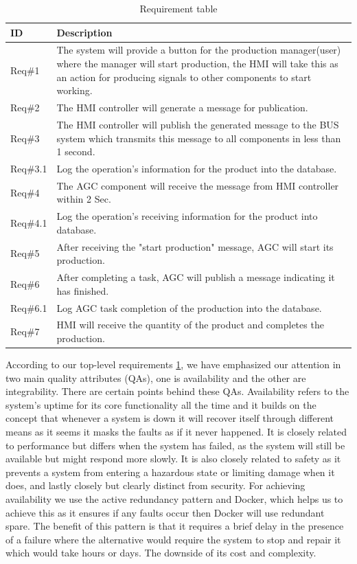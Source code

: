\begin{table}[h]
\begin{tabular}{|p{1cm}|p{7cm}|}
\hline
ID & Description \\
\hline
Req\#1 & The system will provide a button for the production manager(user) where the manager will start production, the HMI will take this as an action for producing signals to other components to start working. \\
\hline
Req\#2 & The HMI controller will generate a message for publication. \\
\hline
Req\#3 & The HMI controller will publish the generated message to the BUS system which transmits this message to all components in less than 1 second. \\
\hline
Req\#3.1 & Log the operation’s information for the product into the database. \\
\hline
Req\#4 & The AGC component will receive the message from HMI controller within 2 Sec. \\
\hline
Req\#4.1 & Log the operation’s receiving information for the product into database. \\
\hline
Req\#5 & After receiving the "start production" message, AGC will start its production. \\
\hline
Req\#6 & After completing a task, AGC will publish a message indicating it has finished. \\
\hline
Req\#6.1 & Log AGC task completion of the production into the database. \\
\hline
Req\#7 & HMI will receive the quantity of the product and completes the production. \\
\hline
\end{tabular}
\caption{Requirement table}
\label{tab:req_table}
\end{table}

According to our top-level requirements \ref{tab:req_table}, we have emphasized our attention in two main quality attributes (QAs), one is availability and the other are integrability. There are certain points behind these QAs. Availability refers to the system's uptime for its core functionality all the time and it builds on the concept that whenever a system is down it will recover itself through different means as it seems it masks the faults as if it never happened. It is closely related to performance but differs when the system has failed, as the system will still be available but might respond more slowly. It is also closely related to safety as it prevents a system from entering a hazardous state or limiting damage when it does, and lastly closely but clearly distinct from security\cite{bass2021software}. For achieving availability we use the active redundancy pattern and Docker, which helps us to achieve this as it ensures if any faults occur then Docker will use redundant spare. The benefit of this pattern is that it requires a brief delay in the presence of a failure where the alternative would require the system to stop and repair it which would take hours or days. The downside of its cost and complexity. 

